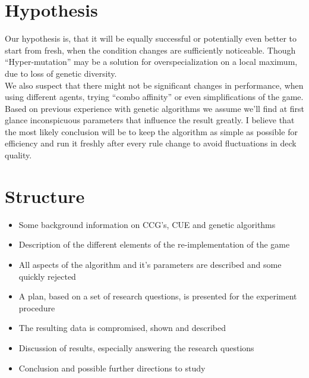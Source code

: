 \section{Hypothesis}
\label{sec:intro:hypothesis}
Our hypothesis is, that it will be equally successful or potentially even better to start from fresh, when the condition changes are sufficiently noticeable. Though “Hyper-mutation” may be a solution for overspecialization on a local maximum, due to loss of genetic diversity. \\
We also suspect that there might not be significant changes in performance, when using different agents, trying “combo affinity” or even simplifications of the game. Based on previous experience with genetic algorithms we assume we’ll find at first glance inconspicuous parameters that influence the result greatly. I believe that the most likely conclusion will be to keep the algorithm as simple as possible for efficiency and run it freshly after every rule change to avoid fluctuations in deck quality.

\section{Structure}
\label{sec:intro:structure}
\begin{itemize}
	\item Some background information on \ac{CCG}'s, CUE and genetic algorithms
	\item Description of the different elements of the re-implementation of the game
	\item All aspects of the algorithm and it's parameters are described and some quickly rejected
	\item A plan, based on a set of research questions, is presented for the experiment procedure
	\item The resulting data is compromised, shown and described
	\item Discussion of results, especially answering the research questions
	\item Conclusion and possible further directions to study
\end{itemize}